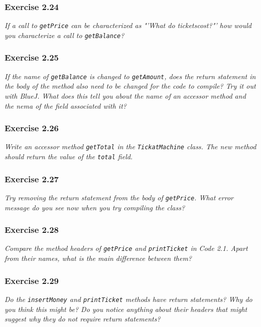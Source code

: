 \subsubsection*{Exercise 2.24}
\textit{If a call to \lstinline?getPrice? can be characterized as 
"'What do ticketscost?"' how would you characterize a call to 
\lstinline?getBalance?? }\\

\subsubsection*{Exercise 2.25}
\textit{If the name of \lstinline?getBalance? is changed to 
\lstinline?getAmount?, does the return statement in the body of the method 
also need to be changed for the code to compile? Try it out with BlueJ. What 
does this tell you about the name of an accessor method and the nema of the 
field associated with it? }\\

\subsubsection*{Exercise 2.26}
\textit{Write an accessor method \lstinline?getTotal? in the 
\lstinline?TickatMachine? class. The new method should return the value of the 
\lstinline?total? field. }\\

\subsubsection*{Exercise 2.27}
\textit{Try removing the return statement from the body of 
\lstinline?getPrice?. What error message do you see now when you try compiling 
the class? }\\

\subsubsection*{Exercise 2.28}
\textit{Compare the method headers of \lstinline?getPrice? and 
\lstinline?printTicket? in Code 2.1. Apart from their names, what is the main 
difference between them? }\\

\subsubsection*{Exercise 2.29}
\textit{Do the \lstinline?insertMoney? and \lstinline?printTicket? methods have 
return statements? Why do you think this might be? Do you notice anything about 
their headers that might suggest why they do not require return statements? }\\

